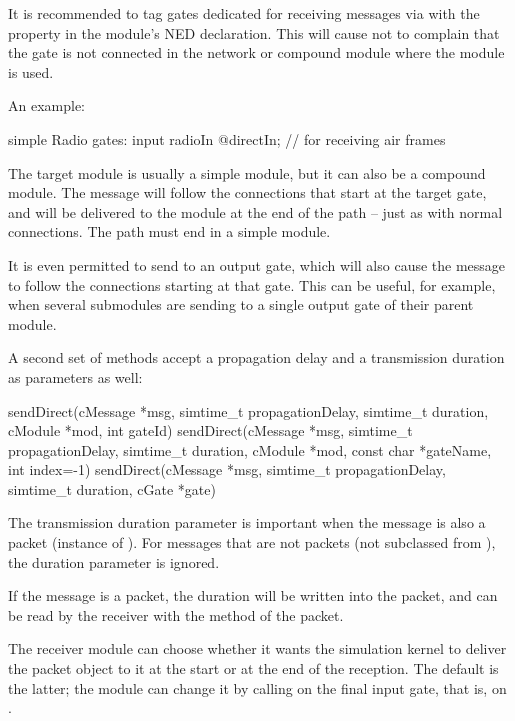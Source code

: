 It is recommended to tag gates dedicated for receiving messages via
 with the  property in the module's NED
declaration. This will cause {\opp} not to complain that the gate is not
connected in the network or compound module where the module is used.

An example:

\begin{ned}
simple Radio {
    gates:
        input radioIn @directIn; // for receiving air frames
}
\end{ned}

The target module is usually a simple module, but it can also be a compound
module. The message will follow the connections that start at the target
gate, and will be delivered to the module at the end of the path -- just as
with normal connections. The path must end in a simple module.

It is even permitted to send to an output gate, which will also cause the
message to follow the connections starting at that gate.
This can be useful, for example, when several submodules are sending
to a single output gate of their parent module.

A second set of  methods accept a propagation
delay and a transmission duration as parameters as well:

\begin{cpp}
sendDirect(cMessage *msg, simtime_t propagationDelay, simtime_t duration,
           cModule *mod, int gateId)
sendDirect(cMessage *msg, simtime_t propagationDelay, simtime_t duration,
           cModule *mod, const char *gateName, int index=-1)
sendDirect(cMessage *msg, simtime_t propagationDelay, simtime_t duration,
           cGate *gate)
\end{cpp}

The transmission duration parameter is important when the message is also
a packet (instance of ). For messages that are not packets
(not subclassed from ), the duration parameter
is ignored.

If the message is a packet, the duration will be written into the packet,
and can be read by the receiver with the  method of
the packet.

The receiver module can choose whether it wants the simulation kernel
to deliver the packet object to it at the start or at the end of the
reception. The default is the latter; the module can change it by calling
 on the final input gate, that is, on
.


